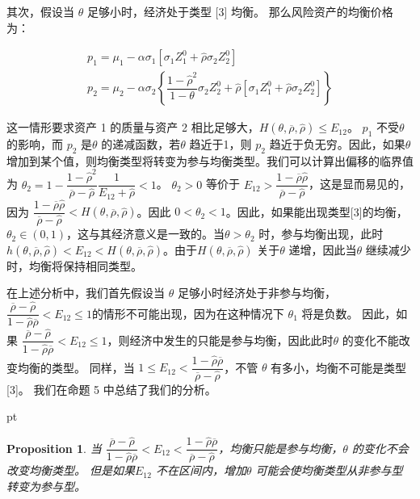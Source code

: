 \documentclass[10.0pt]{article}
\newtheorem{prop}{Proposition}
\begin{document}
其次，假设当 $ \theta $ 足够小时，经济处于类型 [3] 均衡。 那么风险资产的均衡价格为：

\begin{eqnarray*}
& p_1 = \mu_1 - \alpha \sigma_1 \left[ \sigma_1 Z_1^0 + {\hat \rho} \sigma_2 Z_2^0 \right] & \\
& p_2 = \mu_2 - \alpha \sigma_2 \left\{ \dfrac{1 - {\hat \rho}^2}{1 - \theta} \sigma_2 Z_2^0 + {\hat \rho} \left[ \sigma_1 Z_1^0 + {\hat \rho} \sigma_2 Z_2^0 \right] \right\} &
\end{eqnarray*}


这一情形要求资产 1 的质量与资产 2 相比足够大，$H (\theta, \overline{\rho}, {\hat \rho}) \leqslant E_{1 2} $。 $ p_1 $ 不受$ \theta $ 的影响，而 $ p_2 $ 是$ \theta $ 的递减函数，若$ \theta $ 趋近于1，则 $ p_2 $ 趋近于负无穷。因此，如果$ \theta $ 增加到某个值，则均衡类型将转变为参与均衡类型。我们可以计算出偏移的临界值为 $ \theta_2 = 1 - \dfrac{1 - {\hat \rho}^2}{\overline{\rho} - {\hat \rho}} \dfrac{1 }{E_{1 2} + {\hat \rho}} < 1 $。 $ \theta_2 > 0 $ 等价于 $ E_{1 2} > \dfrac{1 - \overline{\rho} {\hat \rho}}{\overline{\rho} - {\hat \rho}} $，这是显而易见的，因为 $ \dfrac{1 - \overline{\rho} {\hat \rho}}{\overline{\rho} - {\hat \rho}} < H (\theta, \overline{\rho }, {\hat \rho}) $。因此 $ 0 < \theta_2 < 1 $。因此，如果能出现类型[3]的均衡，$\theta_2\in(0, 1)$，这与其经济意义是一致的。当$ \theta > \theta_2 $ 时，参与均衡出现，此时$ h (\theta, \overline{\rho}, {\hat \rho}) < E_{1 2} < H (\theta, \overline{\rho}, {\hat \rho}) $。由于$ H (\theta, \overline{\rho}, {\hat \rho}) $ 关于$ \theta $ 递增，因此当$ \theta $ 继续减少时，均衡将保持相同类型。




在上述分析中，我们首先假设当 $ \theta $ 足够小时经济处于非参与均衡， $ \dfrac{\overline{\rho} - {\hat \rho}}{1 - {\hat \rho} \overline{\rho}} < E_{1 2} \leqslant 1 $的情形不可能出现，因为在这种情况下 $\theta_{1}$ 将是负数。 因此，如果 $ \dfrac{\overline{\rho} - {\hat \rho}}{1 - {\hat \rho} \overline{\rho}} < E_{1 2} \leqslant 1 $，则经济中发生的只能是参与均衡，因此此时$ \theta $ 的变化不能改变均衡的类型。 同样，当 $ 1 \leqslant E_{1 2} < \dfrac{1 - {\hat \rho} \overline{\rho}}{\overline{\rho} - {\hat \rho}} $，不管 $ \theta $ 有多小，均衡不可能是类型[3]。 我们在命题 5 中总结了我们的分析。

 pt

\begin{prop}


当 $ \dfrac{\overline{\rho} - {\hat \rho}}{1 - {\hat \rho} \overline{\rho}} < E_{1 2} < \dfrac{1 - {\hat \rho} \overline{\rho}}{\overline{\rho} - {\hat \rho}} $，均衡只能是参与均衡，$ \theta $ 的变化不会改变均衡类型。 但是如果$ E_{1 2} $ 不在区间内，增加$ \theta $ 可能会使均衡类型从非参与型转变为参与型。
\end{prop}
\end{document}
